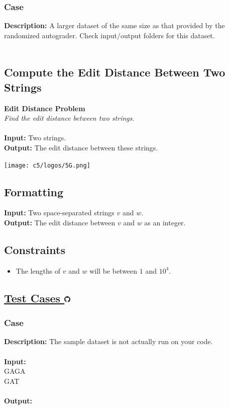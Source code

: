 \documentclass{article}
\newcommand{\code}[1]{{\fontfamily{pcr}\selectfont #1}}
\newcommand{\gitlogo}{\includegraphics[height=12.5]{c0/gitlogo.png}}
\begin{document}
\subsubsection*{Case }
\hline \vspace{5}
\textbf{Description:} A larger dataset of the same size as that provided by the randomized autograder. Check input/output folders for this dataset.\\ \\
\pagebreak

\subsection{Compute the Edit Distance Between Two Strings}
\hline\vspace{5}
\textbf{Edit Distance Problem}\\
\emph{Find the edit distance between two strings}.\\ \\
\textbf{Input:} Two strings.\\
\textbf{Output:} The edit distance between these strings.
\begin{center}
    \texttt{[image: c5/logos/5G.png]}
\end{center}
\hline\vspace{5}

\subsection*{Formatting}
\noindent\textbf{Input:} Two space-separated strings $v$ and $w$.\\
\noindent\textbf{Output:} The edit distance between $v$ and $w$ as an integer.

\subsection*{Constraints}
\begin{itemize}
    \item The lengths of $v$ and $w$ will be between $1$ and $10^4$.
\end{itemize}
\pagebreak

\subsection*{\href{https://github.com/rjeveloff/BA_problemregister/tree/main/test_cases/chapter_5/5G}{Test Cases \gitlogo}}
\subsubsection*{Case }
\hline \vspace{5}
\textbf{Description:} The sample dataset is not actually run on your code.\\ \\
\noindent \textbf{Input:}\\
\code{GAGA\\GAT}\\ \\
\noindent \textbf{Output:}\\
\code{2}
\end{document}
